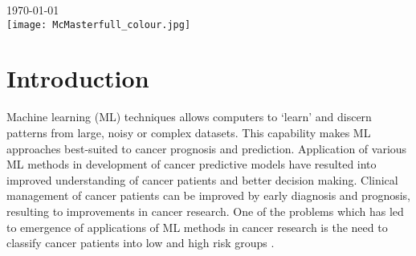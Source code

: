\begin{titlepage}


{\large \today}\\[2cm] %


\texttt{[image: McMasterfull\_colour.jpg]}\\[1cm] %


\vfill %

\end{titlepage}

\linespread{1.25}




\section{Introduction}

\noindent
{}
Machine learning (ML) techniques allows computers to `learn' and discern patterns from large, noisy or complex datasets. This capability makes ML approaches best-suited to cancer prognosis and prediction. Application of various ML methods in development of cancer predictive models have resulted into improved understanding of cancer patients and better decision making. Clinical management of cancer patients can be improved by early diagnosis and prognosis, resulting to improvements in cancer research. One of the problems which has led to emergence of applications of ML methods in cancer research is the need to classify cancer patients into low and high risk groups \citep{kourou2015machine}.\\


